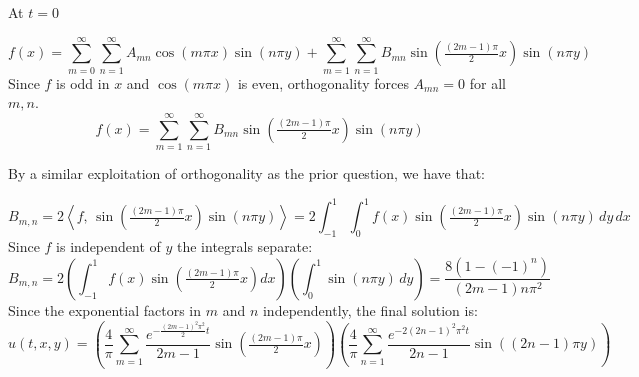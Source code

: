 \documentclass{article} %
\begin{document}
At $t = 0$

\[
  f(x) =
  \sum_{m=0}^{\infty}\sum_{n=1}^{\infty}
  A_{mn}\cos(m\pi x)\sin(n\pi y)
  +
  \sum_{m=1}^{\infty}\sum_{n=1}^{\infty}
  B_{mn}\sin\!\left(\tfrac{(2m-1)\pi}{2}x\right)\sin(n\pi y)
\]
Since $f$ is odd in $x$ and $\cos(m\pi x)$ is even, orthogonality forces
$A_{mn}=0$ for all $m,n$.
\[
  f(x) =
  \sum_{m=1}^{\infty}\sum_{n=1}^{\infty}
  B_{mn}\sin\!\left(\tfrac{(2m-1)\pi}{2}x\right)\sin(n\pi y)
\]

By a similar exploitation of orthogonality as the prior question, we have that:

\[
  B_{m,n} = 2\left\langle
  f,\,\sin\!\left(\tfrac{(2m-1)\pi}{2}x\right)\sin(n\pi y)\right\rangle
  = 2\!\int_{-1}^{1}\!\int_0^1 f(x)
  \sin\!\left(\tfrac{(2m-1)\pi}{2}x\right)\sin(n\pi y)\,dy\,dx
\]
Since $f$ is independent of $y$ the integrals separate:
\[
  B_{m,n} = 2\left(\int_{-1}^1 f(x)
  \sin\!\left(\tfrac{(2m-1)\pi}{2}x\right)dx\right)
  \left(\int_0^1\sin(n\pi y)\,dy\right)
  = \frac{8(1-(-1)^n)}{(2m-1)n\pi^2}
\]
Since the exponential factors in $m$ and $n$
independently, the final solution is:
\[
  u(t,x,y) =
  \left(\frac{4}{\pi}\sum_{m=1}^{\infty}
    \frac{e^{-\frac{(2m-1)^2\pi^2}{2}t}}{2m-1}
  \sin\!\left(\tfrac{(2m-1)\pi}{2}x\right)\right)
  \!\left(\frac{4}{\pi}\sum_{n=1}^{\infty}
    \frac{e^{-2(2n-1)^2\pi^2 t}}{2n-1}
  \sin\!\left((2n-1)\pi y\right)\right)
\]
\end{document}
